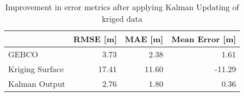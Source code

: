 \begin{table}
\centering
\caption{Improvement in error metrics after applying Kalman Updating of kriged data}
\label{tab:oahu3_gebco_raster_error}
\begin{tabular}{lrrr}
\toprule
 & RMSE [m] & MAE [m] & Mean Error [m] \\
\midrule
GEBCO & 3.73 & 2.38 & 1.61 \\
Kriging Surface & 17.41 & 11.60 & -11.29 \\
Kalman Output & 2.76 & 1.80 & 0.36 \\
\bottomrule
\end{tabular}
\end{table}
